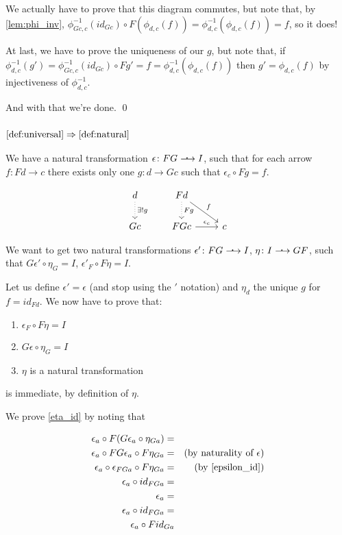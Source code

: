 \documentclass[]{article}
\newcommand{\dotarrow}{%
	\mathrel{\ooalign{\hss\raise.65ex\hbox{\scalebox{1.25}{\normalfont .}}%
	\kern0.35ex\hss\cr$\longrightarrow$}}}
\begin{document}
We actually have to prove that this diagram commutes, but note that, by \cref{lem:phi_inv}, $\phi_{Gc,c}^{-1}(id_{Gc}) \circ F (\phi_{d,c}(f)) = \phi_{d,c}^{-1}(\phi_{d,c}(f)) = f$, so it does!

At last, we have to prove the uniqueness of our $g$, but note that, if $\phi_{d,c}^{-1}(g') = \phi_{Gc,c}^{-1}(id_{Gc}) \circ F g' = f = \phi_{d,c}^{-1}(\phi_{d,c}(f))$ then $g' = \phi_{d,c}(f)$ by injectiveness of $\phi_{d,c}^{-1}$.

And with that we're done. \qed

\subsubsection{$\ref{def:universal} \Rightarrow \ref{def:natural}$}
We have a natural transformation $\epsilon \colon FG \dotarrow I$, such that for each arrow $f \colon Fd \to c$ there exists only one $g \colon d \to G c$ such that $\epsilon_c \circ F g = f$.

\[
\begin{tikzcd}
d \arrow[d, dotted, "\exists! g"] & F d \arrow[d, dotted, "F g"] \arrow[rd, "f"] \\ Gc & FGc \arrow[r, "\epsilon_c"] & c
\end{tikzcd}
\]

We want to get two natural transformations $\epsilon' \colon FG \dotarrow I$, $\eta \colon I \dotarrow GF$, such that $G\epsilon' \circ \eta_G = I$, $\epsilon'_F \circ F\eta = I$.

Let us define $\epsilon' = \epsilon$ (and stop using the $'$ notation) and $\eta_d$ the unique $g$ for $f = id_{Fd}$. We now have to prove that:
\begin{enumerate}
	\item \label{epsilon_id} $\epsilon_F \circ F\eta = I$
	\item \label{eta_id} $G\epsilon \circ \eta_G = I$
	\item \label{eta_natural} $\eta$ is a natural transformation
\end{enumerate}

 is immediate, by definition of $\eta$.

\blackqed

We prove \cref{eta_id} by noting that

\[
\begin{aligned}
  \epsilon_a \circ F(G \epsilon_a \circ \eta_{Ga}) =
  \\ \epsilon_a \circ FG \epsilon_a \circ F\eta_{Ga} = && \text{(by naturality of $\epsilon$)}
  \\ \epsilon_a \circ \epsilon_{FGa} \circ F \eta_{Ga} = && \text{(by \cref{epsilon_id})}
  \\ \epsilon_a \circ id_{FG a} = 
  \\ \epsilon_a = 
  \\ \epsilon_{a} \circ id_{FGa} = 
  \\ \epsilon_{a} \circ F id_{Ga}
\end{aligned}
\]
 
\end{document}
